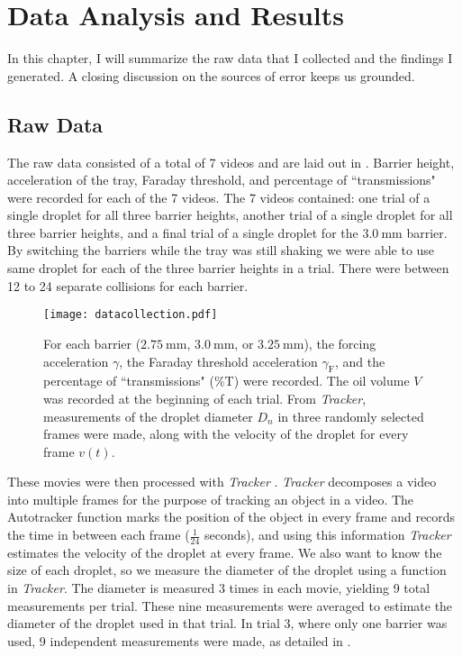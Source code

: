 \chapter{Data Analysis and Results}

In this chapter, I will summarize the raw data that I collected and the findings I generated. A closing discussion on the sources of error keeps us grounded.

\section{Raw Data}
The raw data consisted of a total of 7 videos and are laid out in . Barrier height, acceleration of the tray, Faraday threshold, and percentage of ``transmissions" were recorded for each of the 7 videos. The 7 videos contained: one trial of a single droplet for all three barrier heights, another trial of a single droplet for all three barrier heights, and a final trial of a single droplet for the $3.0~\mathrm{mm}$ barrier. By switching the barriers while the tray was still shaking we were able to use same droplet for each of the three barrier heights in a trial. There were between 12 to 24 separate collisions for each barrier. 

\begin{figure}[h!]
	\centering
	\texttt{[image: datacollection.pdf]}
	\caption{For each barrier ($2.75~\mathrm{mm}$, $3.0~\mathrm{mm}$, or $3.25~\mathrm{mm}$), the forcing acceleration $\gamma$, the Faraday threshold acceleration $\gamma_\mathrm{F}$, and the percentage of ``transmissions" (\%T) were recorded. The oil volume $V$ was recorded at the beginning of each trial. From \textit{Tracker}, measurements of the droplet diameter $D_n$ in three randomly selected frames were made, along with the velocity of the droplet for every frame $v(t)$.}
	\label{datacollection}
\end{figure}

These movies were then processed with \textit{Tracker} \cite{tracker}. \textit{Tracker} decomposes a video into multiple frames for the purpose of tracking an object in a video. The Autotracker function marks the position of the object in every frame and records the time in between each frame ($\frac{1}{24}$ seconds), and using this information \textit{Tracker} estimates the velocity of the droplet at every frame. We also want to know the size of each droplet, so we measure the diameter of the droplet using a function in \textit{Tracker}. The diameter is measured 3 times in each movie, yielding 9 total measurements per trial. These nine measurements were averaged to estimate the diameter of the droplet used in that trial. In trial 3, where only one barrier was used, 9 independent measurements were made, as detailed in .

